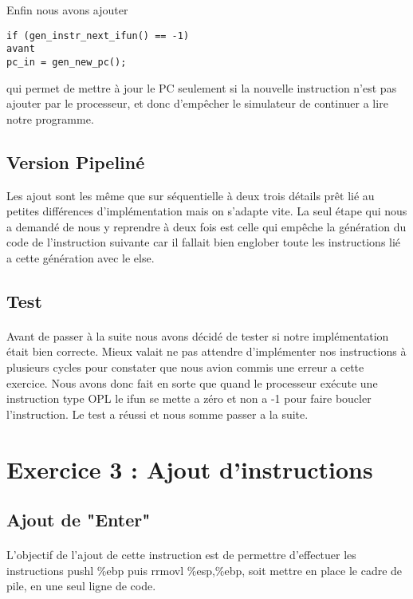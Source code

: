 \documentclass[12pt]{article}
\begin{document}
Enfin nous avons ajouter 
\begin{verbatim}
if (gen_instr_next_ifun() == -1)
avant
pc_in = gen_new_pc();
\end{verbatim}
qui permet de mettre à jour le PC seulement si la nouvelle instruction n'est pas ajouter par le processeur, et donc d’empêcher le simulateur de continuer a lire notre programme.

\subsection{Version Pipeliné}
Les ajout sont les même que sur séquentielle à deux trois détails prêt lié au petites différences d’implémentation mais on s’adapte vite. La seul étape qui nous a demandé de nous y reprendre à deux fois est celle qui empêche la génération du code de l'instruction suivante car il fallait bien englober toute les instructions lié a cette génération avec le else.

\subsection{Test} 
\paragraph{} Avant de passer à la suite nous avons décidé de tester si notre implémentation était bien correcte. Mieux valait ne pas attendre d’implémenter nos instructions à plusieurs cycles pour constater que nous avion commis une erreur a cette exercice.
Nous avons donc fait en sorte que quand le processeur exécute une instruction type OPL le ifun se mette a zéro et non a -1 pour faire boucler l'instruction. Le test a réussi et nous somme passer a la suite.

\newpage
\section{Exercice 3 : Ajout d'instructions}
\subsection{Ajout de "Enter"}

\paragraph{}L'objectif de l'ajout de cette instruction est de permettre d'effectuer les instructions pushl \%ebp puis rrmovl \%esp,\%ebp, soit mettre en place le cadre de pile, en une seul ligne de code.
\end{document}
